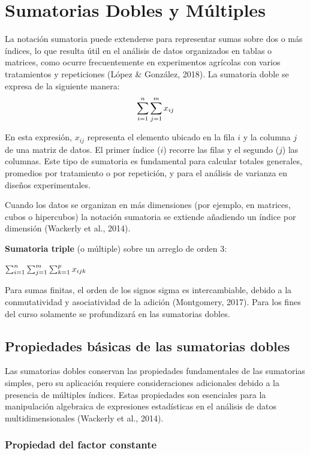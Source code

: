 \documentclass[
  spanish,
  letterpaper,
]{book}
\begin{document}
\chapter{Sumatorias Dobles y
Múltiples}\label{sumatorias-dobles-y-muxfaltiples}

La notación sumatoria puede extenderse para representar sumas sobre dos
o más índices, lo que resulta útil en el análisis de datos organizados
en tablas o matrices, como ocurre frecuentemente en experimentos
agrícolas con varios tratamientos y repeticiones (López \& González,
2018). La sumatoria doble se expresa de la siguiente manera:
\[\huge\sum_{i=1}^{n}\sum_{j=1}^{m} x_{ij}\]

En esta expresión, \(x_{ij}\)\hspace{0pt} representa el elemento ubicado
en la fila \(i\) y la columna \(j\) de una matriz de datos. El primer
índice (\(i\)) recorre las filas y el segundo (\(j\)) las columnas. Este
tipo de sumatoria es fundamental para calcular totales generales,
promedios por tratamiento o por repetición, y para el análisis de
varianza en diseños experimentales.

Cuando los datos se organizan en más dimensiones (por ejemplo, en
matrices, cubos o hipercubos) la notación sumatoria se extiende
añadiendo un índice por dimensión (Wackerly et al., 2014).

\textbf{Sumatoria triple} (o múltiple) sobre un arreglo de orden 3:

\(\Huge\sum_{i=1}^{n}\sum_{j=1}^{m}\sum_{k=1}^{p} x_{ijk}\)

Para sumas finitas, el orden de los signos sigma es intercambiable,
debido a la conmutatividad y asociatividad de la adición (Montgomery,
2017). Para los fines del curso solamente se profundizará en las
sumatorias dobles.

\section{Propiedades básicas de las sumatorias
dobles}\label{propiedades-buxe1sicas-de-las-sumatorias-dobles}

Las sumatorias dobles conservan las propiedades fundamentales de las
sumatorias simples, pero su aplicación requiere consideraciones
adicionales debido a la presencia de múltiples índices. Estas
propiedades son esenciales para la manipulación algebraica de
expresiones estadísticas en el análisis de datos multidimensionales
(Wackerly et al., 2014).

\subsection{Propiedad del factor
constante}\label{propiedad-del-factor-constante}
\end{document}
